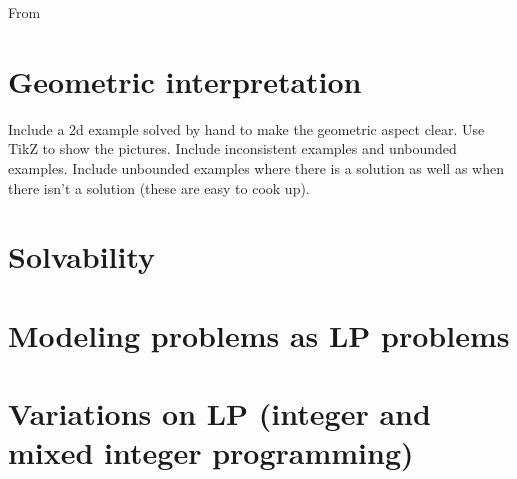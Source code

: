 \documentclass[12pt,english]{article}
\begin{document}
From 

\section{Geometric interpretation}

Include a 2d example solved by hand to make the geometric aspect clear.  Use TikZ to show the pictures.   Include inconsistent examples and unbounded examples.  Include unbounded examples where there is a solution as well as when there isn't a solution (these are easy to cook up).

\section{Solvability}

\section{Modeling problems as LP problems}

\section{Variations on LP (integer and mixed integer programming)}

{}

\end{document}
